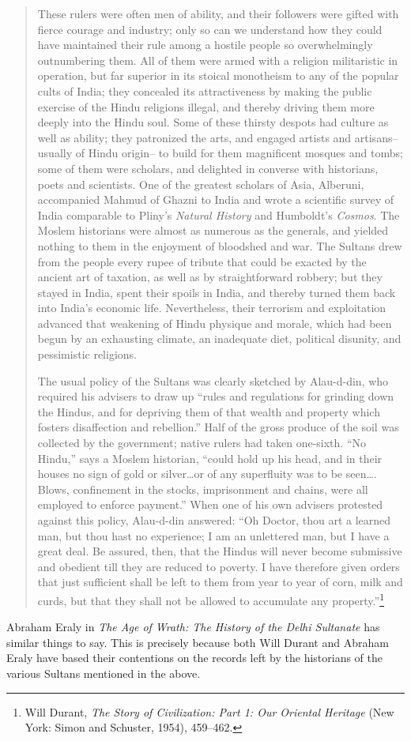 \begin{quote}
These rulers were often men of ability, and their followers were gifted with fierce courage and industry; only so can we understand how they could have maintained their rule among a hostile people so overwhelmingly outnumbering them. All of them were armed with a religion militaristic in operation, but far superior in its stoical monotheism to any of the popular cults of India; they concealed its attractiveness by making the public exercise of the Hindu religions illegal, and thereby driving them more deeply into the Hindu soul. Some of these thirsty despots had culture as well as ability; they patronized the arts, and engaged artists and artisans–usually of Hindu origin– to build for them magnificent mosques and tombs; some of them were scholars, and delighted in converse with historians, poets and scientists. One of the greatest scholars of Asia, Alberuni, accompanied Mahmud of Ghazni to India and wrote a scientific survey of India comparable to Pliny’s \textit{Natural History} and Humboldt’s \textit{Cosmos}. The Moslem historians were almost as numerous as the generals, and yielded nothing to them in the enjoyment of bloodshed and war. The Sultans drew from the people every rupee of tribute that could be exacted by the ancient art of taxation, as well as by straightforward robbery; but they stayed in India, spent their spoils in India, and thereby turned them back into India’s economic life. Nevertheless, their terrorism and exploitation advanced that weakening of Hindu physique and morale, which had been begun by an exhausting climate, an inadequate diet, political disunity, and pessimistic religions. 

The usual policy of the Sultans was clearly sketched by Alau-d-din, who required his advisers to draw up “rules and regulations for grinding down the Hindus, and for depriving them of that wealth and property which fosters disaffection and rebellion.” Half of the gross produce of the soil was collected by the government; native rulers had taken one-sixth. “No Hindu,” says a Moslem historian, “could hold up his head, and in their houses no sign of gold or silver…or of any superfluity was to be seen…. Blows, confinement in the stocks, imprisonment and chains, were all employed to enforce payment.” When one of his own advisers protested against this policy, Alau-d-din answered: “Oh Doctor, thou art a learned man, but thou hast no experience; I am an unlettered man, but I have a great deal. Be assured, then, that the Hindus will never become submissive and obedient till they are reduced to poverty. I have therefore given orders that just sufficient shall be left to them from year to year of corn, milk and curds, but that they shall not be allowed to accumulate any property.”\footnote{Will Durant, \textit{The Story of Civilization: Part 1: Our Oriental Heritage} (New York: Simon and Schuster, 1954), 459--462.} 
\end{quote}
Abraham Eraly in \textit{The Age of Wrath: The History of the Delhi Sultanate} has similar things to say. This is precisely because both Will Durant and Abraham Eraly have based their contentions on the records left by the historians of the various Sultans mentioned in the above.

